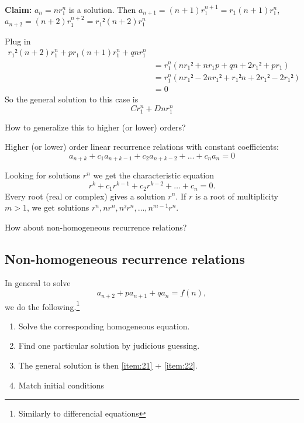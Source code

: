\documentclass[english]{lbscript}
\begin{document}
\textbf{Claim:} \(a_n=n r_1^{n}\) is a solution. Then \(a_{n+1}=(n+1)r_1^{n+1}= r_1 (n+1)r_1^{n}\), \(a_{n+2}=(n+2)r_1^{n+2}= r_1²(n+2)r_1^{n}\)

Plug in
\begin{align}
  \label{eq:77}
  r_1²(n+2)r_1^{n}+p r_1(n+1) r_1^{n} + qn r_1^{n}               \\
   & = r_1^{n}\left(n r_1² + n r_1p + qn + 2r_1² + p r_1 \right) \\
   & = r_1^{n}\left(n r_1² - 2n r_1² + r_1²n+2r_1²-2r_1² \right) \\
   & = 0
\end{align}
So the general solution to this case is
\begin{equation}
  \label{eq:78}
  C r_1^{n}+D n r_1^{n}
\end{equation}

How to generalize this to higher (or lower) orders?

Higher (or lower) order linear recurrence relations with constant coefficients:
\begin{equation}
  \label{eq:79}
  a_{n+k} + c_1 a_{n+k-1} + c_2 a_{n+k-2}+\dots+c_n a_n = 0
\end{equation}

Looking for solutions \(r^{n}\) we get the characteristic equation
\begin{equation}
  \label{eq:80}
  r^{k} + c_1 r^{k-1} + c_2 r^{k-2}+\dots + c_n = 0.
\end{equation}
Every root (real or complex) gives a solution \(r^{n}\). If \(r\) is a root of multiplicity \(m>1\), we get solutions \(r^{n}, n r^{n}, n² r^{n}, \dots, n^{m-1} r^{n}\).


How about non-homogeneous recurrence relations?\\

\subsection{Non-homogeneous recurrence relations}
\label{sec:non-homog-recurr}

In general to solve
\begin{equation}
  \label{eq:81}
  a_{n+2} + p a_{n+1} + q a_{n} = f(n),
\end{equation}
we do the following.\footnote{Similarly to differencial equations}
\begin{enumerate}[label=\arabic{*})]
  \item\label{item:21} Solve the corresponding homogeneous equation.
  \item\label{item:22} Find one particular solution by judicious guessing.
  \item\label{item:23} The general solution is then \ref{item:21} + \ref{item:22}.
  \item\label{item:24} Match initial conditions
\end{enumerate}
\end{document}
